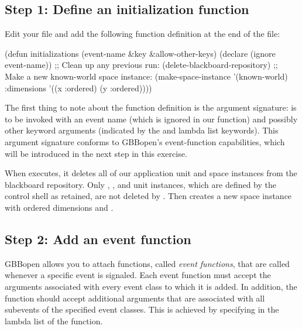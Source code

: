 \documentclass[10pt,twoside,english,pdftex]{article}
\begin{document}
\subsection*{Step 1: Define an initialization function}

Edit your  file and add the following
function definition at the end of the file:
%
\W\supp
\begin{example}
  (defun initializations (event-name &key &allow-other-keys)
    (declare (ignore event-name))
    ;; Clean up any previous run:
    (delete-blackboard-repository)
    ;; Make a new known-world space instance:
    (make-space-instance 
     '(known-world)
     :dimensions '((x :ordered) (y :ordered))))
\end{example}

The first thing to note about the function definition is the argument
signature:  is to be invoked with an event name
(which is ignored in our function) and possibly other keyword arguments
(indicated by the  and  lambda
list keywords).  This argument signature conforms to GBBopen's event-function
capabilities, which will be introduced in the next step in this exercise.

When  executes, it deletes all of our application
unit and space instances from the blackboard repository.  Only ,
, and  unit instances,
which are defined by the control shell as retained, are not deleted by
.  Then
 creates a new  space
instance with ordered dimensions  and .

\subsection*{Step 2: Add an event function}

GBBopen allows you to attach functions, called \textit{event functions}, that
are called whenever a specific event is signaled.  Each event function must
accept the arguments associated with every event class to which it is
added. In addition, the function should accept additional arguments that are
associated with all subevents of the specified event classes. This is achieved
by specifying  in the lambda list of the
function.
\end{document}
